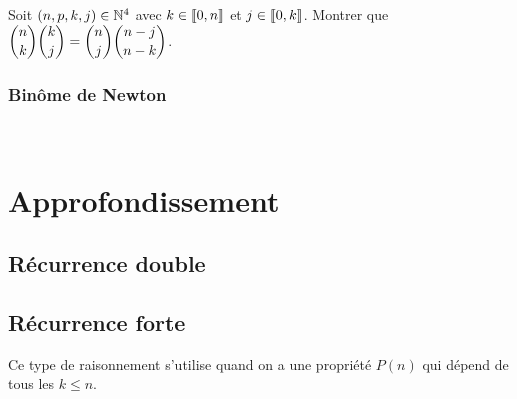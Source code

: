 \documentclass[a4paper, 11pt,reqno]{article}
\begin{document}
\begin{exercice} Soit $(n,p,k,j)\in\mathbb{N}^4$ avec $k\in\llbracket 0,n\rrbracket$ et $j\in\llbracket 0,k\rrbracket$. Montrer que $\displaystyle\binom{n}{k}\binom{k}{j}=\displaystyle\binom{n}{j}\displaystyle\binom{n-j}{n-k}$.
\end{exercice}

\subsubsection{Binôme de Newton}

\begin{theorem}

\noindent\\

\end{theorem}












\section{Approfondissement}
\subsection{Récurrence double}

\subsection{Récurrence forte}
Ce type de raisonnement s'utilise quand on a une propriété $P(n)$ qui dépend de tous les $k\leq n$.
\end{document}
